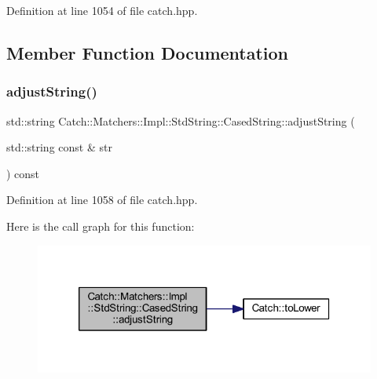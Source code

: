 Definition at line 1054 of file catch.\+hpp.



\subsection{Member Function Documentation}
\hypertarget{struct_catch_1_1_matchers_1_1_impl_1_1_std_string_1_1_cased_string_a8117fdcee8fd8a8e5001b38e0bd19848}{}\label{struct_catch_1_1_matchers_1_1_impl_1_1_std_string_1_1_cased_string_a8117fdcee8fd8a8e5001b38e0bd19848} 
\subsubsection{\texorpdfstring{adjust\+String()}{adjustString()}}
{\footnotesize\ttfamily std\+::string Catch\+::\+Matchers\+::\+Impl\+::\+Std\+String\+::\+Cased\+String\+::adjust\+String (\begin{DoxyParamCaption}\item[{std\+::string const \&}]{str }\end{DoxyParamCaption}) const\hspace{0.3cm}{\ttfamily [inline]}}



Definition at line 1058 of file catch.\+hpp.

Here is the call graph for this function\+:\nopagebreak
\begin{figure}[H]
\begin{center}
\leavevmode
\includegraphics[width=320pt]{struct_catch_1_1_matchers_1_1_impl_1_1_std_string_1_1_cased_string_a8117fdcee8fd8a8e5001b38e0bd19848_cgraph}
\end{center}
\end{figure}
\hypertarget{struct_catch_1_1_matchers_1_1_impl_1_1_std_string_1_1_cased_string_ac12f719f5d1aeb28a2bc2f6cc8b95b37}{}\label{struct_catch_1_1_matchers_1_1_impl_1_1_std_string_1_1_cased_string_ac12f719f5d1aeb28a2bc2f6cc8b95b37} 
